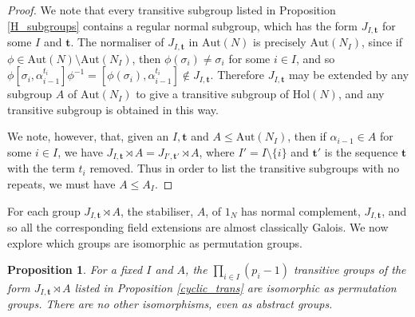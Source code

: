 \documentclass[a4paper,reqno]{amsart}
\newtheorem{proposition}[theorem]{Proposition}
\theoremstyle{definition}
\newcommand{\bt}{\textbf{t}}
\newcommand{\Aut}{\mathrm{Aut}}
\newcommand{\Hol}{\mathrm{Hol}}
\begin{document}
\begin{proof}
    We note that every transitive subgroup listed in Proposition \ref{H_subgroups} contains a regular normal subgroup, which has the form $J_{I,\bt}$ for some $I$ and $\bt$. The normaliser of $J_{I,\bt}$ in $\Aut(N)$ is precisely $\Aut(N_I)$, since if $\phi \in \Aut(N)\setminus \Aut(N_I)$, then $\phi(\sigma_i)\neq \sigma_i$ for some $i \in I$, and so $\phi \left[\sigma_i,\alpha_{i-1}^{t_i}\right]\phi^{-1}=\left[\phi(\sigma_i),\alpha_{i-1}^{t_i}\right]\notin J_{I,\bt}$. Therefore $J_{I,\bt}$ may be extended by any subgroup $A$ of $\Aut(N_I)$ to give a transitive subgroup of $\Hol(N)$, and any transitive subgroup is obtained in this way.

    We note, however, that, given an $I,\bt$ and $A \leq \Aut(N_I)$, then if $\alpha_{i-1} \in A$ for some $i \in I$, we have $J_{I,\bt} \rtimes A = J_{I',\bt'} \rtimes A$, where $I'=I\setminus\{i\}$ and $\bt'$ is the sequence $\bt$ with the term $t_i$ removed. Thus in order to list the transitive subgroups with no repeats, we must have $A \leq A_I$.
\end{proof}
    For each group $J_{I,\bt} \rtimes A$, the stabiliser, $A$, of $1_N$ has normal complement, $J_{I,\bt}$, and so all the corresponding field extensions are almost classically Galois. We now explore which groups are isomorphic as permutation groups.
\begin{proposition}\label{cyclic_isoms_cunningham}
    For a fixed $I$ and $A$, the $\prod_{i \in I}(p_i-1)$ transitive groups of the form $J_{I,\bt} \rtimes A$ listed in Proposition \ref{cyclic_trans} are isomorphic as permutation groups. There are no other isomorphisms, even as abstract groups.
\end{proposition}
\end{document}

